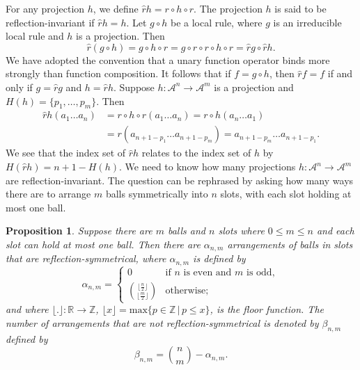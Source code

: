 \documentclass[11pt,a4paper]{article}
\newcommand{\rev}[1]{{\color{blue}#1}}
\newcommand{\rev}[1]{{\color{black}#1}}
\newtheorem{prop}{Proposition}
\begin{document}
For any projection $h$, we define $\hat{r} h = r \circ h \circ r$.
The projection $h$ is said to be reflection-invariant if $\hat{r}h = h$.
Let $g \circ h$ be a local rule,  where $g$ is an irreducible local rule and $h$ is a projection.
Then
\[
\hat{r}(g \circ h)  = g \circ h \circ  r  = g \circ r \circ r \circ h \circ r =
\hat{r}g \circ \hat{r}h.
\]
We have adopted the convention that a unary function operator binds more strongly than function composition.
It follows that if $f = g \circ h$, then $\hat{r} f = f$ if and only if $g = \hat{r}g$ and $h = \hat{r}h$.
Suppose $h: \mathcal{A}^n \to \mathcal{A}^m$ is a projection and $H(h) = \{p_1, \ldots, p_m\}$.
Then
\begin{align*}
\hat{r}h(a_1\ldots a_n) & = r \circ h \circ r(a_1\ldots a_n) =
r \circ h(a_n \ldots a_1) \\
& = r(a_{n+1-{p_1}} \ldots a_{n+1-{p_m}})
= a_{n+1-{p_m}} \ldots a_{n+1-p_1}.
\end{align*}
We see that the index set of $\hat{r}h$ relates to the index set of $h$ by
$H(\hat{r}h) = n + 1 - H(h)$.
We need to know how many projections $h: \mathcal{A}^n \to \mathcal{A}^m$ are reflection-invariant.
The question can be rephrased by asking how many ways there are to arrange $m$ balls symmetrically into
$n$ slots, \rev{with each slot} holding at most one ball.
\begin{prop}
\label{prop:inv-h}
Suppose there are $m$ balls and $n$ slots \rev{where $0\leq m\leq n$ and each slot can hold at most one ball.}
Then there are $\alpha_{n,m}$ arrangements of balls in slots that are reflection-symmetrical,
where $\alpha_{n,m}$ is defined by
\[
\alpha_{n,m} = \left\{
\begin{array}{ll}
0 & \mbox{if $n$ is even and $m$ is odd}, \\
\binom{\lfloor \frac{n}{2} \rfloor }{\lfloor \frac{m}{2} \rfloor } & \mbox{otherwise;}
\end{array}
\right.
\]
and where $\lfloor.\rfloor : \mathbb{R} \to \mathbb{Z}$,
$\lfloor x \rfloor = \mathrm{max}\{ p \in \mathbb{Z} \, | \, p \le x\}$, is the floor function.
The number of arrangements that are not reflection-symmetrical is denoted by $\beta_{n,m}$ defined by
\[
\beta_{n,m} = \binom{n}{m} - \alpha_{n,m}.
\]
\end{prop}
\end{document}
